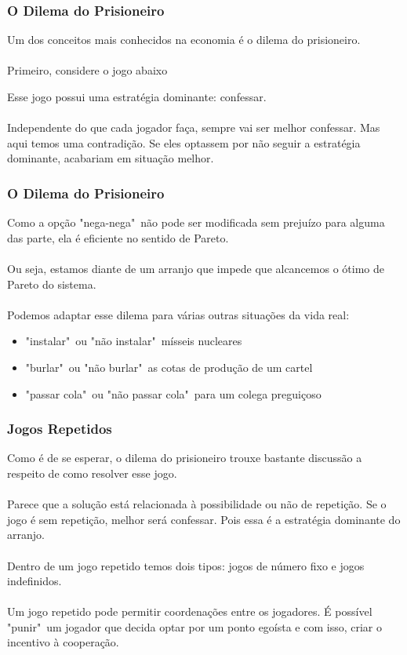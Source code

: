 \documentclass{beamer}[10]
\begin{document}
\begin{frame}
	\frametitle{O Dilema do Prisioneiro}

	Um dos conceitos mais conhecidos na economia é o dilema do prisioneiro.
	\\~\\
	Primeiro, considere o jogo abaixo

	\begin{center}
		\usebox{\mybox}
	\end{center}

	Esse jogo possui uma estratégia dominante: confessar. 
	\\~\\
	Independente do que cada jogador faça, sempre vai ser melhor confessar. Mas aqui temos uma contradição. Se eles optassem por não seguir a estratégia dominante, acabariam em situação melhor.

\end{frame}

\begin{frame}
	\frametitle{O Dilema do Prisioneiro}

	Como a opção "nega-nega"\ não pode ser modificada sem prejuízo para alguma das parte, ela é eficiente no sentido de Pareto. 
	\\~\\
	Ou seja, estamos diante de um arranjo que impede que alcancemos o ótimo de Pareto do sistema.
	\\~\\
	Podemos adaptar esse dilema para várias outras situações da vida real:
	\begin{itemize}
		\item "instalar"\ ou "não instalar"\ mísseis nucleares
		\item "burlar"\ ou "não burlar"\ as cotas de produção de um cartel
		\item "passar cola"\ ou "não passar cola"\ para um colega preguiçoso
	\end{itemize}

\end{frame}

\begin{frame}
	\frametitle{Jogos Repetidos}

	Como é de se esperar, o dilema do prisioneiro trouxe bastante discussão a respeito de como resolver esse jogo. 
	\\~\\
	Parece que a solução está relacionada à possibilidade ou não de repetição. Se o jogo é sem repetição, melhor será confessar. Pois essa é a estratégia dominante do arranjo.
	\\~\\
	Dentro de um jogo repetido temos dois tipos: jogos de número fixo e jogos indefinidos.
	\\~\\
	Um jogo repetido pode permitir coordenações entre os jogadores. É possível "punir"\ um jogador que decida optar por um ponto egoísta e com isso, criar o incentivo à cooperação.

\end{frame}
\end{document}
